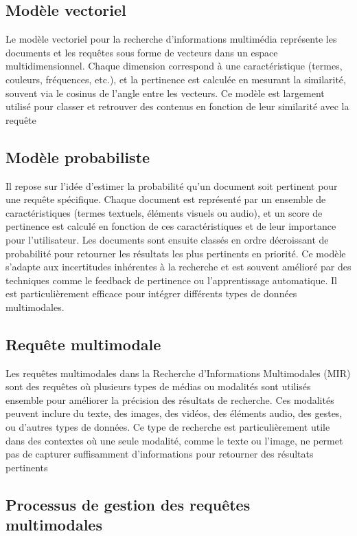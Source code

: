 \begin{section}
 \subsection{Modèle vectoriel}
 Le modèle vectoriel pour la recherche d'informations multimédia représente les
 documents et les requêtes sous forme de vecteurs dans un espace
 multidimensionnel. Chaque dimension correspond à une caractéristique (termes,
 couleurs, fréquences, etc.), et la pertinence est calculée en mesurant la
 similarité, souvent via le cosinus de l'angle entre les vecteurs. Ce modèle est
 largement utilisé pour classer et retrouver des contenus en fonction de leur
 similarité avec la requête
 \subsection{Modèle probabiliste}
 Il repose sur l'idée d'estimer la probabilité qu'un document soit pertinent
 pour une requête spécifique. Chaque document est représenté par un ensemble de
 caractéristiques (termes textuels, éléments visuels ou audio), et un score de
 pertinence est calculé en fonction de ces caractéristiques et de leur
 importance pour l'utilisateur. Les documents sont ensuite classés en ordre
 décroissant de probabilité pour retourner les résultats les plus pertinents en
 priorité. Ce modèle s'adapte aux incertitudes inhérentes à la recherche et est
 souvent amélioré par des techniques comme le feedback de pertinence ou
 l'apprentissage automatique. Il est particulièrement efficace pour intégrer
 différents types de données multimodales.
 \section{Requête multimodale}
 Les requêtes multimodales dans la Recherche d'Informations Multimodales (MIR)
 sont des requêtes où plusieurs types de médias ou modalités sont utilisés
 ensemble pour améliorer la précision des résultats de recherche. Ces modalités
 peuvent inclure du texte, des images, des vidéos, des éléments audio, des
 gestes, ou d'autres types de données. Ce type de recherche est particulièrement
 utile dans des contextes où une seule modalité, comme le texte ou l'image, ne
 permet pas de capturer suffisamment d'informations pour retourner des résultats
 pertinents
 \subsection{Processus de gestion des requêtes multimodales}


\end{section}
